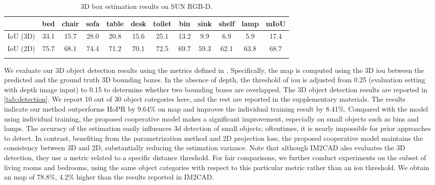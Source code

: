 \documentclass{article}
\makeatletter
\renewcommand{\paragraph}{\@startsection{paragraph}{4}{\z@}{0ex \@plus 0ex \@minus 0ex}{-1em}{\hskip\parindent\normalfont\normalsize\bfseries}}
\makeatother
\begin{document}
\begin{table}[b!]
    \caption{3D box estimation results on SUN RGB-D.}
    \setlength{\tabcolsep}{4pt}
    \centering
    \begin{tabular}{c c c c c c c c c c c c}
        \Xhline{2\arrayrulewidth}
         & bed & chair & sofa & table & desk & toilet  & bin  & sink & shelf & lamp & mIoU\\
        \hline
         IoU (3D) & 33.1 & 15.7 & 28.0 & 20.8 & 15.6 & 25.1  & 13.2 & 9.9 & 6.9 & 5.9 & 17.4  \\
         IoU (2D) & 75.7 & 68.1 & 74.4 & 71.2 & 70.1 & 72.5  & 69.7 & 59.3 & 62.1 & 63.8 & 68.7  \\
        \Xhline{2\arrayrulewidth}
    \end{tabular}
    \label{tab:box_estimation}
\end{table}

\paragraph{3D Object Detection}

We evaluate our 3D object detection results using the metrics defined in \citep{song2015sun}. Specifically, the \ac{map} is computed using the 3D \ac{iou} between the predicted and the ground truth 3D bounding boxes. In the absence of depth, the threshold of \ac{iou} is adjusted from 0.25 (evaluation setting with depth image input) to 0.15 to determine whether two bounding boxes are overlapped. The 3D object detection results are reported in \autoref{tab:detection}. We report 10 out of 30 object categories here, and the rest are reported in the supplementary materials. The results indicate our method outperforms HoPR by 9.64\% on \ac{map} and improves the individual training result by 8.41\%. Compared with the model using individual training, the proposed cooperative model makes a significant improvement, especially on small objects such as bins and lamps. The accuracy of the estimation easily influences 3d detection of small objects; oftentimes, it is nearly impossible for prior approaches to detect. In contrast, benefiting from the parametrization method and 2D projection loss, the proposed cooperative model maintains the consistency between 3D and 2D, substantially reducing the estimation variance. Note that although IM2CAD also evaluates the 3D detection, they use a metric related to a specific distance threshold. For fair comparisons, we further conduct experiments on the subset of living rooms and bedrooms, using the same object categories with respect to this particular metric rather than an \ac{iou} threshold. We obtain an \ac{map} of 78.8\%, 4.2\% higher than the results reported in IM2CAD.
\end{document}
